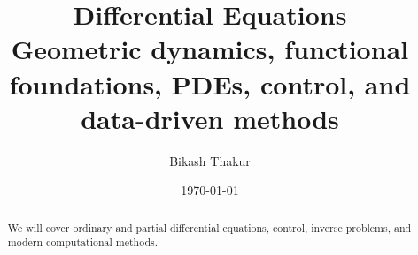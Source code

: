 \documentclass[11pt]{article}
\title{%
    {\sffamily\huge\bfseries\color{DarkNavy} Differential Equations}\\[6pt]
    {\sffamily\large\color{AccentGray} Geometric dynamics, functional foundations, PDEs, control, and data-driven methods}
}
\author{{\sffamily Bikash Thakur}}
\date{{\sffamily\small\color{AccentGray} \today}}
\begin{document}

\pagecolor{OffWhite}
\color{DarkNavy}

\maketitle
\thispagestyle{plain}

\begin{abstract}
\noindent
We will cover ordinary and partial differential equations, control, inverse problems, and modern computational methods.
\end{abstract}

\tableofcontents
\newpage


\printindex
\end{document}
